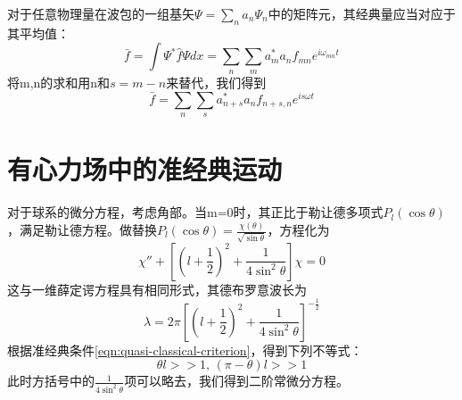 \documentclass[12pt, a4paper, oneside]{ctexbook}
\newcounter{#2}
\newcounter{#2}[#1]
\numberwithin{#2}{#1}
\newcommand{\xkuo}[1]{\left(#1\right)}
\newcommand{\akuo}[1]{\left[#1\right]}
\begin{document}
            \begin{deduce}
              对于任意物理量在波包的一组基矢\(\Psi=\sum\limits_{n}a_n\Psi_n\)中的矩阵元，其经典量应当对应于其平均值： 
              \begin{equation*}
                \bar f=\int\Psi^*\hat f\Psi dx=\sum_n\sum_ma^*_ma_nf_{mn}e^{i\omega_{mn}t}
              \end{equation*}
              将m,n的求和用n和\(s=m-n\)来替代，我们得到
              \begin{equation*}
                \bar f=\sum_n\sum_s a^*_{n+s}a_nf_{n+s,n}e^{is\omega t}
              \end{equation*}
            \end{deduce}

            \section{有心力场中的准经典运动}
            \begin{deduce}
              对于球系的微分方程，考虑角部。当m=0时，其正比于勒让德多项式\(P_l(\cos \theta)\)，满足勒让德方程。做替换\(P_l(\cos\theta)=\frac{\chi(\theta)}{\sqrt{\sin\theta}}\)，方程化为
              \begin{equation}
                \chi''+\akuo{\xkuo{l+\frac12}^2+\frac{1}{4\sin^2\theta}}\chi=0
              \end{equation}
              这与一维薛定谔方程具有相同形式，其德布罗意波长为
              \begin{equation*}
                \lambda = 2\pi\akuo{\xkuo{l+\frac12}^2+\frac1{4\sin^2\theta}}^{-\frac12}
              \end{equation*}
              根据准经典条件\autoref{eqn:quasi-classical-criterion}，得到下列不等式：
              \begin{equation}
                \theta l>>1,\,(\pi-\theta)l>>1
              \end{equation}
              此时方括号中的\(\frac1{4\sin^2\theta}\)项可以略去，我们得到二阶常微分方程。
            \end{deduce}

            


            



        
        
\end{document}
